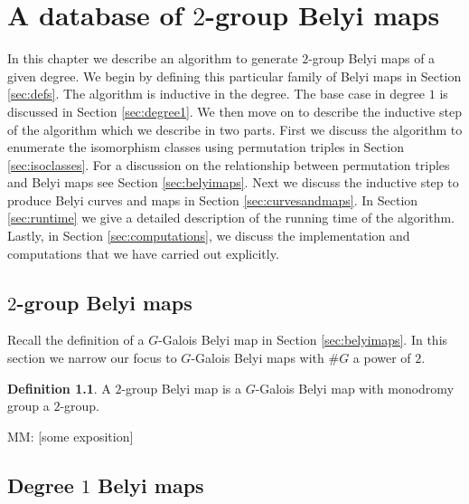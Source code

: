 \documentclass{dcthesis}
\newcommand{\defi}[1]{\textsf{#1}}
\newcommand{\mm}[1]{{\color{blue} \sf MM: [#1]}}
\theoremstyle{definition}
\newtheorem{definition}[prop]{Definition}
\theoremstyle{remark}
\numberwithin{equation}{section}
\numberwithin{figure}{section}
\begin{document}
\chapter{A database of $2$-group Belyi maps}{\label{chapter:database}
  In this chapter we describe an algorithm
  to generate $2$-group Belyi maps of a given degree.
  We begin by defining this particular family of Belyi maps in Section \ref{sec:defs}.
  The algorithm is inductive in the degree.
  The base case in degree $1$ is discussed in Section \ref{sec:degree1}.
  We then move on to describe the inductive step of the algorithm
  which we describe in two parts.
  First we discuss the algorithm to enumerate the isomorphism classes
  using permutation triples in Section \ref{sec:isoclasses}.
  For a discussion on the relationship between permutation triples and Belyi maps
  see Section \ref{sec:belyimaps}.
  Next we discuss the inductive step to produce Belyi curves and maps in Section \ref{sec:curvesandmaps}.
  In Section \ref{sec:runtime} we give a detailed description of the running time of the algorithm.
  Lastly,
  in Section \ref{sec:computations},
  we discuss the implementation and computations that we have carried out explicitly.
  \section{$2$-group Belyi maps}{\label{sec:defs}
    Recall the definition of a $G$-Galois Belyi map in Section \ref{sec:belyimaps}.
    In this section we narrow our focus
    to $G$-Galois Belyi maps with $\#G$ a power of $2$.
    \begin{definition}\label{def:2groupbelyi}
      A \defi{$2$-group Belyi map} is a $G$-Galois Belyi map
      with monodromy group a $2$-group.
    \end{definition}
    \mm{some exposition}
  }
  \section{Degree $1$ Belyi maps}{\label{sec:degree1}
  }
}
\end{document}
